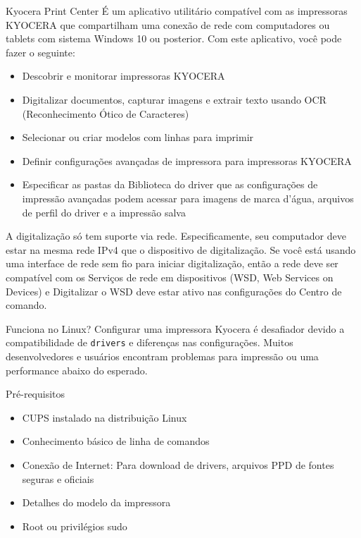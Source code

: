 \documentclass{if-beamer}
\begin{document}
\begin{frame}[allowframebreaks]{Kyocera Print Center}
    É um aplicativo utilitário compatível com as impressoras KYOCERA que compartilham 
    uma conexão de rede com computadores ou tablets com sistema Windows 10 ou posterior. 
    Com este aplicativo, você pode fazer o seguinte:
    \begin{itemize}
        \item Descobrir e monitorar impressoras KYOCERA
        \item Digitalizar documentos, capturar imagens e extrair texto usando OCR (Reconhecimento Ótico de Caracteres)
        \item Selecionar ou criar modelos com linhas para imprimir
        \item Definir configurações avançadas de impressora para impressoras KYOCERA
        \item Especificar as pastas da Biblioteca do driver que as configurações de impressão avançadas podem acessar para
        imagens de marca d'água, arquivos de perfil do driver e a impressão salva
    \end{itemize}

    \framebreak

    A digitalização só tem suporte via rede. Especificamente, seu computador deve estar na mesma rede IPv4 que o dispositivo
    de digitalização. Se você está usando uma interface de rede sem fio para iniciar digitalização, então a rede deve ser 
    compatível com os Serviços de rede em dispositivos (WSD, Web Services on Devices) e Digitalizar o WSD deve estar ativo
    nas configurações do Centro de comando.

    \framebreak

    \begin{block}{Funciona no Linux?}
        Configurar uma impressora Kyocera é desafiador devido a compatibilidade de \texttt{drivers} e diferenças nas 
        configurações. Muitos desenvolvedores e usuários encontram problemas para impressão ou uma performance abaixo do esperado.
    \end{block}


    \framebreak

    \begin{block}{Pré-requisitos}
        \begin{itemize}
            \item CUPS instalado na distribuição Linux
            \item Conhecimento básico de linha de comandos
            \item Conexão de Internet: Para download de drivers, arquivos PPD de fontes seguras e oficiais
            \item Detalhes do modelo da impressora
            \item Root ou privilégios sudo
        \end{itemize}
    \end{block}
\end{frame}
\end{document}
